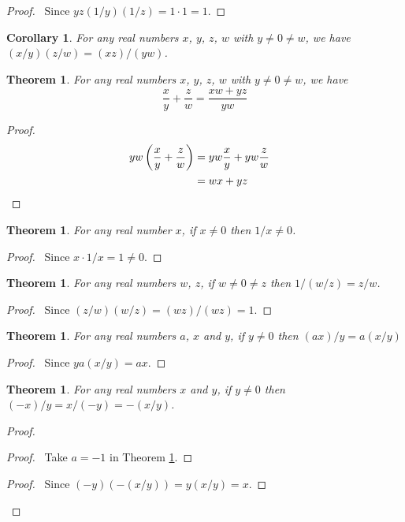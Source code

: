 \documentclass{report}
\let\qed\relax
\newtheorem{cor}{Corollary}[ax]
\newtheorem{thm}[ax]{Theorem}
\theoremstyle{definition}
\begin{document}
\begin{proof}
\pf\ Since $yz(1/y)(1/z) = 1 \cdot 1 = 1$. \qed
\end{proof}

\begin{cor}
For any real numbers $x$, $y$, $z$, $w$ with $y \neq 0 \neq w$, we have $(x/y)(z/w) = (xz)/(yw)$.
\end{cor}

\begin{thm}
For any real numbers $x$, $y$, $z$, $w$ with $y \neq 0 \neq w$, we have
\[ \frac{x}{y} + \frac{z}{w} = \frac{xw + yz}{yw} \]
\end{thm}

\begin{proof}
\pf
\begin{align*}
yw \left( \frac{x}{y} + \frac{z}{w} \right)
& = y w \frac{x}{y} + yw \frac{z}{w} \\
& = wx + yz & \qed
\end{align*}
\end{proof}

\begin{thm}
For any real number $x$, if $x \neq 0$ then $1/x \neq 0$.
\end{thm}

\begin{proof}
\pf\ Since $x \cdot 1/x = 1 \neq 0$. \qed
\end{proof}

\begin{thm}
For any real numbers $w$, $z$, if $w \neq 0 \neq z$ then $1 / (w / z) = z/w$.
\end{thm}

\begin{proof}
\pf\ Since $(z/w)(w/z) = (wz)/(wz) = 1$. \qed
\end{proof}

\begin{thm}
\label{thm:multiply_quotient}
For any real numbers $a$, $x$ and $y$, if $y \neq 0$ then $(ax)/y = a(x/y)$
\end{thm}

\begin{proof}
\pf\ Since $ya(x/y) = ax$. \qed
\end{proof}

\begin{thm}
For any real numbers $x$ and $y$, if $y \neq 0$ then $(-x)/y = x/(-y) = -(x/y)$.
\end{thm}

\begin{proof}
\pf
{}
\begin{proof}
	\pf\ Take $a = -1$ in Theorem \ref{thm:multiply_quotient}.
\end{proof}
\begin{proof}
	\pf\ Since $(-y)(-(x/y)) = y(x/y) = x$.
\end{proof}
\qed
\end{proof}
\end{document}
